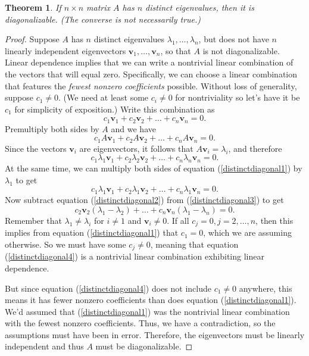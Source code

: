 \documentclass[12pt]{article}
\renewcommand{\vec}[1]{\mathbf{#1}}
\newtheorem{theorem}{Theorem}
\theoremstyle{definition}
\begin{document}
\begin{theorem}
	If $n \times n$ matrix $A$ has $n$ distinct eigenvalues, then it is diagonalizable. (The converse is not necessarily true.)
\end{theorem}
\begin{proof}
	Suppose $A$ has $n$ distinct eigenvalues $\lambda_1, \hdots, \lambda_n$, but does not have $n$ linearly independent eigenvectors $\vec{v}_1, \hdots, \vec{v}_n$, so that $A$ is not diagonalizable. Linear dependence implies that we can write a nontrivial linear combination of the vectors that will equal zero. Specifically, we can choose a linear combination that features the \emph{fewest nonzero coefficients} possible. Without loss of generality, suppose $c_1 \neq 0$. (We need at least some $c_i \neq 0$ for nontriviality so let's have it be $c_1$ for simplicity of exposition.) Write this combination as 
\begin{equation}
		c_1\vec{v}_1 + c_2\vec{v}_2 + \hdots + c_n\vec{v}_n =0.  	 \label{distinctdiagonal1}
\end{equation}
Premultiply both sides by $A$ and we have
\[	c_1A\vec{v}_1 + c_2A\vec{v}_2 + \hdots + c_nA\vec{v}_n =0.  		\]
Since the vectors $\vec{v}_i$ are eigenvectors, it follows that $A \vec{v}_i = \lambda_i$, and therefore
\begin{equation}
	c_1\lambda_1\vec{v}_1 + c_2 \lambda_2 \vec{v}_2 + \hdots +  c_n \lambda_n \vec{v}_n=0.  \label{distinctdiagonal2}
\end{equation}
At the same time, we can multiply both sides of equation (\ref{distinctdiagonal1}) by $\lambda_1$ to get  
\begin{equation}
	c_1 \lambda_1 \vec{v}_1 + c_2 \lambda_1 \vec{v}_2 + \hdots + c_n \lambda_1 \vec{v}_n =0.	 \label{distinctdiagonal3}
\end{equation}
Now subtract equation (\ref{distinctdiagonal2}) from (\ref{distinctdiagonal3}) to get
\begin{equation}
	c_2\vec{v}_2(\lambda_1 - \lambda_2) + \hdots + c_n\vec{v}_n(\lambda_1 - \lambda_n) =0.  \label{distinctdiagonal4}
\end{equation}
Remember that $\lambda_1 \neq \lambda_i$ for $i \neq 1$ and $\vec{v}_i \neq 0$. If all $c_j=0, j=2, \hdots, n$, then this implies from equation  (\ref{distinctdiagonal1}) that $c_1 =0$, which we are assuming otherwise. So we must have some $c_j \neq 0$, meaning that equation (\ref{distinctdiagonal4}) is a nontrivial linear combination exhibiting linear dependence. 

But since equation (\ref{distinctdiagonal4}) does not include $c_1 \neq 0$ anywhere, this means it has fewer nonzero coefficients than does equation (\ref{distinctdiagonal1}). We'd assumed that  (\ref{distinctdiagonal1}) was the nontrivial linear combination with the fewest nonzero coefficients. Thus, we have a contradiction, so the assumptions must have been in error. Therefore, the eigenvectors must be linearly independent and thus $A$ must be diagonalizable. 
\end{proof}
\end{document}
